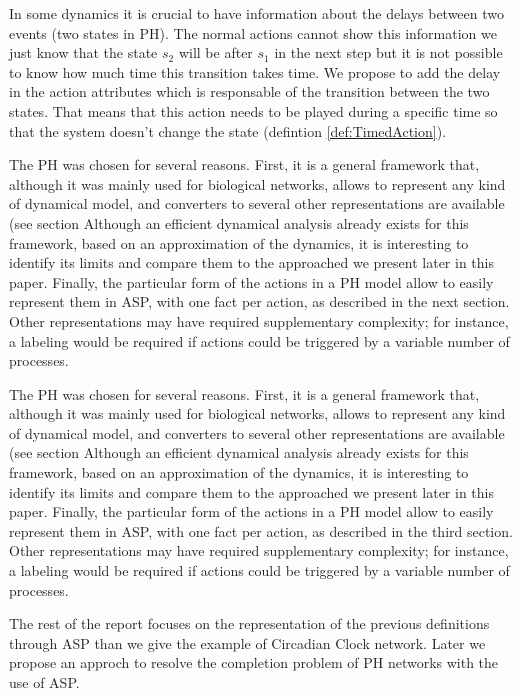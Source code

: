 In some dynamics it is crucial to have information about the delays between two events (two states in PH). The normal actions cannot show this information we just know that the state $s_2$ will be after $s_1$ in the next step but it is not possible to know how much time this transition takes time. We propose to add the delay in the action attributes which is responsable of the transition between the two states. That means that this action needs to be played during a specific time so that the system doesn't change the state (defintion \ref{def:TimedAction}).

\begin{definition}
\label{def:TimedAction}

\end{definition}

\begin{definition}
\label{def:TempSort}

\end{definition}

The PH was chosen for several reasons.
First, it is a general framework that,
although it was mainly used for biological networks,
allows to represent any kind of dynamical model,
and converters to several other representations are available (see section%
Although an efficient dynamical analysis already exists for this framework,
based on an approximation of the dynamics,
it is interesting to identify its limits
and compare them to the approached we present later in this paper.
Finally, the particular form of the actions in a PH model allow
to easily represent them in ASP,
with one fact per action, as described in the next section.
Other representations may have required supplementary complexity;
for instance, a labeling would be required
if actions could be triggered by a variable number of processes.







The PH was chosen for several reasons.
First, it is a general framework that,
although it was mainly used for biological networks,
allows to represent any kind of dynamical model,
and converters to several other representations are available (see section%
Although an efficient dynamical analysis already exists for this framework,
based on an approximation of the dynamics,
it is interesting to identify its limits
and compare them to the approached we present later in this paper.
Finally, the particular form of the actions in a PH model allow
to easily represent them in ASP,
with one fact per action, as described in the third section.
Other representations may have required supplementary complexity;
for instance, a labeling would be required
if actions could be triggered by a variable number of processes.


The rest of the report focuses on the representation of the previous definitions through ASP than we give the example of Circadian Clock network. Later we propose an approch to resolve the completion problem of PH networks with the use of ASP.

